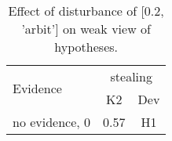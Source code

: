\begin{table}\begin{tabular}{l|cc}\toprule\multirow{2}{*}{Evidence} & \multicolumn{2}{c}{stealing}\\& {K2} & {Dev}\\\midrule
no evidence, 0 & \cellcolor{Bittersweet}0.57&\cellcolor{Bittersweet}H1\\\bottomrule\end{tabular}\caption{Effect of disturbance of [0.2, 'arbit'] on weak view of hypotheses.}\end{table}